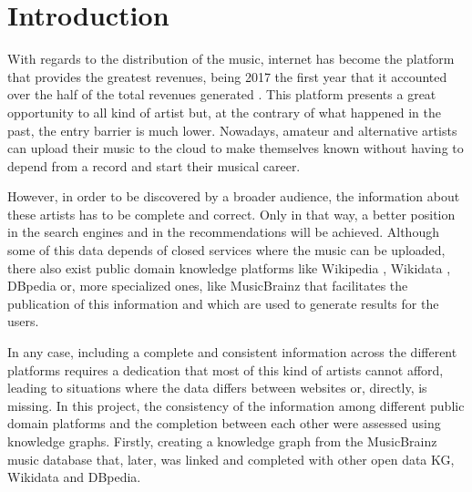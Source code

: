 \section{Introduction}
With regards to the distribution of the music, internet has become the platform that provides the greatest revenues, being 2017 the first year that it accounted over the half of the total revenues generated \citep{music_report_2018}.
This platform presents a great opportunity to all kind of artist but, at the contrary of what happened in the past, the entry barrier is much lower.
Nowadays, amateur and alternative artists can upload their music to the cloud to make themselves known without having to depend from a record and start their musical career. 

However, in order to be discovered by a broader audience, the information about these artists has to be complete and correct.
Only in that way, a better position in the search engines and in the recommendations will be achieved.
Although some of this data depends of closed services where the music can be uploaded, there also exist public domain knowledge platforms like Wikipedia \citep{wikipedia}, Wikidata \citep{wikidata}, DBpedia \citep{dbpedia} or, more specialized ones, like MusicBrainz \citep{musicbrainz} that facilitates the publication of this information and which are used to generate results for the users. 

In any case, including a complete and consistent information across the different platforms requires a dedication that most of this kind of artists cannot afford, leading to situations where the data differs between websites or, directly, is missing.
In this project, the consistency of the information among different public domain platforms and the completion between each other were assessed using knowledge graphs.
Firstly, creating a knowledge graph from the MusicBrainz music database that, later, was linked and completed with other open data KG, Wikidata and DBpedia. 
